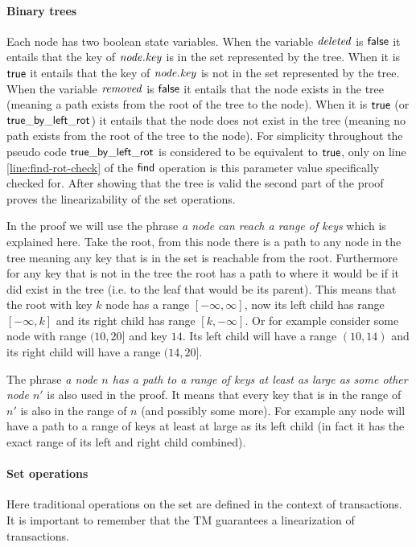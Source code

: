 \paragraph{Binary trees}
Each node has two boolean state variables.
When the variable $\ms{deleted}$ is $\lit{false}$ it entails that the key of $\ms{node.key}$ is in the set represented by the tree.
When it is $\lit{true}$ it entails that the key of $\ms{node.key}$ is not in the set represented by the tree.
When the variable $\ms{removed}$ is $\lit{false}$ it entails that the node exists in the tree (meaning a path exists from the root of the tree to the node).
When it is $\lit{true}$ (or $\lit{true\_by\_left\_rot}$) it entails that the node does not exist in the tree (meaning no path exists from the root of the tree to the node).
For simplicity throughout the pseudo code $\lit{true\_by\_left\_rot}$ is considered to be equivalent to $\lit{true}$, only on line \ref{line:find-rot-check} of the $\lit{find}$ operation is this
parameter value specifically checked for.
After showing that the tree is valid the second part of the proof proves the linearizability of the set operations.

In the proof we will use the phrase \emph{a node can reach a range of keys} which is explained here.
Take the root, from this node there is a path to any node in the tree meaning any key that is in the set is reachable from the root.
Furthermore for any key that is not in the tree the root has a path to where it would be if it did exist in the tree (i.e. to the leaf that would be its parent).
This means that the root with key $k$ node has a range $[-\infty, \infty]$,
now its left child has range $[-\infty,k]$ and its right child has range $[k,-\infty]$.
Or for example consider some node with range $(10, 20]$ and key $14$.
Its left child will have a range $(10, 14)$ and its right child will have a range $(14, 20]$.

The phrase \emph{a node $n$ has a path to a range of keys at least as large as some other node $n'$} is also used in the proof.
It means that every key that is in the range of
$n'$ is also in the range of $n$ (and possibly some more).
For example any node will have a path to a range of keys at least at large as its left child (in fact it has the exact range of its left and right child combined).

\paragraph{Set operations}
Here traditional operations on the set are defined in the context of transactions.
It is important to remember that the TM guarantees a linearization of transactions.

